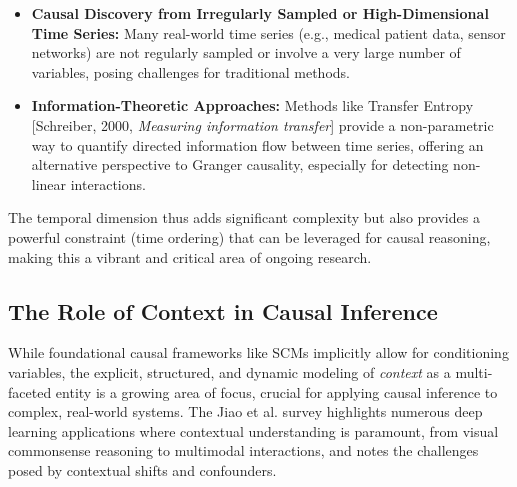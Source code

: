 {\begin{itemize}
    \item \textbf{Causal Discovery from Irregularly Sampled or High-Dimensional Time Series:} Many real-world time series (e.g., medical patient data, sensor networks) are not regularly sampled or involve a very large number of variables, posing challenges for traditional methods.
    \item \textbf{Information-Theoretic Approaches:} Methods like Transfer Entropy [Schreiber, 2000, \textit{Measuring information transfer}] provide a non-parametric way to quantify directed information flow between time series, offering an alternative perspective to Granger causality, especially for detecting non-linear interactions.
\end{itemize}

The temporal dimension thus adds significant complexity but also provides a powerful constraint (time ordering) that can be leveraged for causal reasoning, making this a vibrant and critical area of ongoing research. 


\subsection{The Role of Context in Causal Inference}
\label{subsec:context_temporality_causality}

While foundational causal frameworks like SCMs implicitly allow for conditioning variables, the explicit, structured, and dynamic modeling of \textit{context} as a multi-faceted entity is a growing area of focus, crucial for applying causal inference to complex, real-world systems. The Jiao et al. survey \cite{jiao2024causal} highlights numerous deep learning applications where contextual understanding is paramount, from visual commonsense reasoning to multimodal interactions, and notes the challenges posed by contextual shifts and confounders.

}
